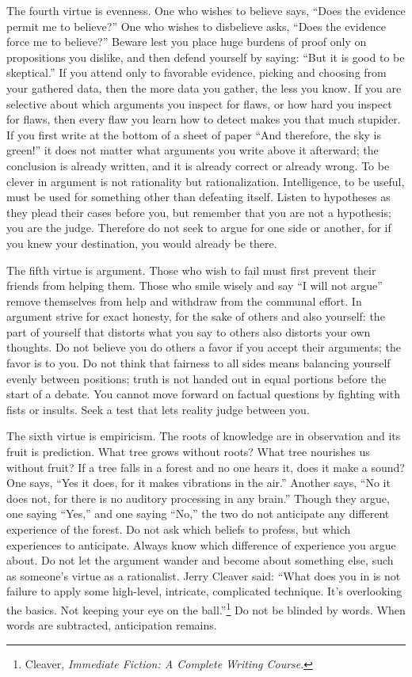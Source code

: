  The fourth virtue is evenness. One who wishes to believe says,
``Does the evidence permit me to
believe?'' One who wishes to disbelieve asks,
``Does the evidence force me to
believe?'' Beware lest you place huge burdens of
proof only on propositions you dislike, and then defend yourself by
saying: ``But it is good to be
skeptical.'' If you attend only to favorable
evidence, picking and choosing from your gathered data, then the more
data you gather, the less you know. If you are selective about which
arguments you inspect for flaws, or how hard you inspect for flaws,
then every flaw you learn how to detect makes you that much stupider.
If you first write at the bottom of a sheet of paper
``And therefore, the sky is green!''
it does not matter what arguments you write above it afterward; the
conclusion is already written, and it is already correct or already
wrong. To be clever in argument is not rationality but rationalization.
Intelligence, to be useful, must be used for something other than
defeating itself. Listen to hypotheses as they plead their cases before
you, but remember that you are not a hypothesis; you are the judge.
Therefore do not seek to argue for one side or another, for if you knew
your destination, you would already be there.


 The fifth virtue is argument. Those who wish to fail must first
prevent their friends from helping them. Those who smile wisely and say
``I will not argue'' remove
themselves from help and withdraw from the communal effort. In argument
strive for exact honesty, for the sake of others and also yourself: the
part of yourself that distorts what you say to others also distorts
your own thoughts. Do not believe you do others a favor if you accept
their arguments; the favor is to you. Do not think that fairness to all
sides means balancing yourself evenly between positions; truth is not
handed out in equal portions before the start of a debate. You cannot
move forward on factual questions by fighting with fists or insults.
Seek a test that lets reality judge between you.


 The sixth virtue is empiricism. The roots of knowledge are in
observation and its fruit is prediction. What tree grows without roots?
What tree nourishes us without fruit? If a tree falls in a forest and
no one hears it, does it make a sound? One says, ``Yes
it does, for it makes vibrations in the air.''
Another says, ``No it does not, for there is no
auditory processing in any brain.'' Though they
argue, one saying ``Yes,'' and one
saying ``No,'' the two do not
anticipate any different experience of the forest. Do not ask which
beliefs to profess, but which experiences to anticipate. Always know
which difference of experience you argue about. Do not let the argument
wander and become about something else, such as
someone's virtue as a rationalist. Jerry Cleaver said:
``What does you in is not failure to apply some
high-level, intricate, complicated technique. It's
overlooking the basics. Not keeping your eye on the
ball.''\footnote{Cleaver, \textit{Immediate Fiction: A Complete Writing
Course}.} Do not be blinded by
words. When words are subtracted, anticipation remains.

